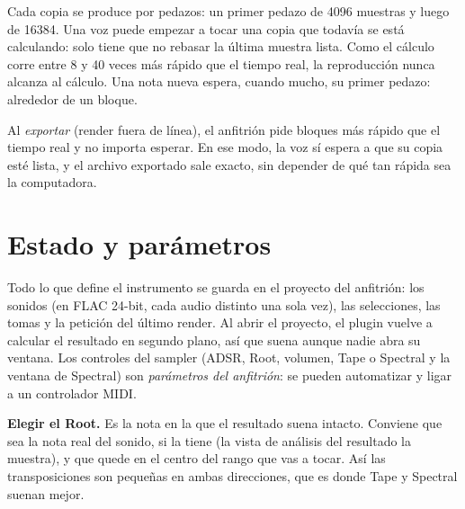 Cada copia se produce por pedazos: un primer pedazo de 4096 muestras y luego de 16384. Una voz
puede empezar a tocar una copia que todavía se está calculando: solo tiene que no rebasar la
última muestra lista. Como el cálculo corre entre 8 y 40 veces más rápido que el tiempo real, la
reproducción nunca alcanza al cálculo. Una nota nueva espera, cuando mucho, su primer pedazo:
alrededor de un bloque.

Al \emph{exportar} (render fuera de línea), el anfitrión pide bloques más rápido que el tiempo real
y no importa esperar. En ese modo, la voz sí espera a que su copia esté lista, y el archivo
exportado sale exacto, sin depender de qué tan rápida sea la computadora.

\section{Estado y parámetros}

Todo lo que define el instrumento se guarda en el proyecto del anfitrión: los sonidos (en FLAC
24-bit, cada audio distinto una sola vez), las selecciones, las tomas y la petición del último
render. Al abrir el proyecto, el plugin vuelve a calcular el resultado en segundo plano, así que
suena aunque nadie abra su ventana. Los controles del sampler (ADSR, Root, volumen, Tape o Spectral
y la ventana de Spectral) son \emph{parámetros del anfitrión}: se pueden automatizar y ligar a un
controlador MIDI.

\begin{estudio}
\textbf{Elegir el Root.} Es la nota en la que el resultado suena intacto. Conviene que sea la nota real
del sonido, si la tiene (la vista de análisis del resultado la muestra), y que quede en el centro del
rango que vas a tocar. Así las transposiciones son pequeñas en ambas direcciones, que es donde Tape
y Spectral suenan mejor.
\end{estudio}
